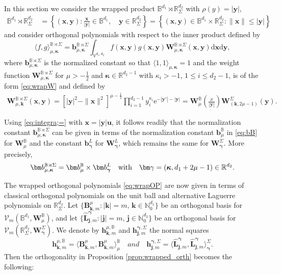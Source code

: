 \documentclass{amsart}
\theoremstyle{remark}
\def\la{{\langle}}
\def\ra{{\rangle}}
\def\d{\mathrm{d}}
\def\e{\mathrm{e}}
\def\k{{\kappa}}
\def\la{{\langle}}
\def\ra{{\rangle}}
\def\bb{{\bm b}}
\def\kb{{\bm k}}
\def\xb{{\bm x}}
\def\yb{{\bm y}}
\def\Lb{{\bm L}}
\def\Wb{{\bm W}}
\def\CV{{\mathcal V}}
\def\BB{{\mathbb B}}
\def\NN{{\mathbb N}}
\def\RR{{\mathbb R}}
\def\VV{{\mathbb V}}
\def\bg{{\boldsymbol{\gamma}}}
\def\bk{{\boldsymbol{\kappa}}}
\def\f{\frac}
\begin{document}
In this section we consider the wrapped product $\BB^{d_1} \rtimes \RR_\Sigma^{d_2}$ with $\rho(y) = |\yb|$, 
\begin{align*}
\BB^{d_1} \rtimes \RR_\Sigma^{d_2} \, & = \left\{(\xb,\yb): \frac{\xb}{|\yb|} \in \BB^{d_1}, \quad \yb \in \RR_\Sigma^{d_2}\right\} 
        = \left\{(\xb,\yb) \in \BB^{d_1} \times \RR_\Sigma^{d_2}:  \| \xb \| \le |\yb|\right\}
\end{align*}
and consider orthogonal polynomials with respect to the inner product defined by
\begin{equation} \label{eq:ipdB-Sig}
  \la f, g\ra_{\mu, \bk}^{\BB\rtimes \Sigma}  = \bm b_{\mu,\bk}^{\BB\rtimes \Sigma}
   \int_{\VV^{d_1, d_2}} f(\bm x,\bm y) g(\bm x,\bm y) 
  \bm W^{\BB\rtimes \Sigma}_{\mu,\bk}(\bm x,\bm y) \d \bm x \d \bm y, 
\end{equation}
where $ \bm b_{\mu,\bk}^{\BB\rtimes \Sigma}$ is the normalized constant so that $ \la 1, 1\ra_{\mu, \bk} =1$ and the weight 
function $\Wb_{\mu, \bk}^{\BB\rtimes \Sigma}$ for $\mu > -\f12$ and $\bk \in \RR^{d_2-1}$ with $\k_i > -1$, $1\le i \le d_2-1$, 
is of the form \eqref{eq:wrapW} and defined by 
\begin{align*}
\Wb_{\mu, \kb}^{\BB\rtimes \Sigma}(\xb,\yb)  = \left[ |\bm y|^2- \|\bm x\|^2 \right]^{\mu - \f12}  \prod_{i=1}^{d_2-1} y_i^{\k_i} \e^{-|\yb'| -|\yb|}
  = \Wb_{\mu}^{\BB} \left( \frac{x}{|\bm y|} \right) \Wb_{(\kb, 2\mu-1)}^\Sigma(\yb).
\end{align*}

Using \eqref{eq:integra;=} with $\bm x = | \bm y| \bm u$, it follows readily that the normalization constant 
$\bb_{\mu,\bk}^{\BB\rtimes \Sigma}$ can be given in terms of the normalization constant $\bm b_\mu^\BB$ 
in \eqref{eq:bB} for $\bm W_\mu^\BB$ and the constant $\bm b_{\bm \gamma}^L$ for $\bm W_{\bm \gamma}^L$,
which remains the same for $\bm W_\bg^\Sigma$. More precisely, 
\begin{equation} \label{eq:b_B-Sig}
  \bm b_{\mu,\bk}^{\BB\rtimes \Sigma} = \bm b^\BB_\mu \times \bm b^L_{\bg} 
       \quad\hbox{with}\quad \bm \gamma = (\bk, d_1+ 2\mu -1) \in \RR^{d_2}. 
\end{equation}

The wrapped orthogonal polynomials \eqref{eq:wrapOP} are now given in terms of classical orthogonal polynomials 
on the unit ball and alternative Laguerre polynomials on $\RR_\Sigma^{d_2}$. Let 
$\{\bm B_{\bm k, m}^{\mu}: |\bm k|= m, \, \bm k \in \NN_0^{d_1}\}$ be an orthogonal basis for 
$\CV_m(\BB^{d_1},\bm W^\BB_\mu)$, and let $\{\hat \Lb_{\bm j, m}^{\bg}: |\bm j| = m, \, \bm j\in \NN_0^{d_2}\}$ 
be an orthogonal basis for $\CV_{m}\left(\RR_\Sigma^{d_2},\bm W^\Sigma_{\bg}\right)$. 
We denote by $\bm h_{\bm k,m}^{\mu,\BB}$ and $\bm h_{\bm j,m}^{\bg,\Sigma}$ the normal squares
$$
  \bm h_{\bm k,m}^{\mu, \BB} =  \langle \bm B_{\bm k, m}^{\mu}, \bm B_{\bm k, m}^{\mu}\rangle_{\mu}^\BB
 \quad and \quad \bm h_{\bm j,m}^{\bg,\Sigma} = \big \langle \hat \Lb_{\bm j, m}^{\bg}, \hat \Lb_{\bm j, m}^{\bg} \big \rangle_{\bg}^\Sigma.
$$
Then the orthogonality in Proposition \ref{prop:wrapped_orth} becomes the following:
\end{document}
